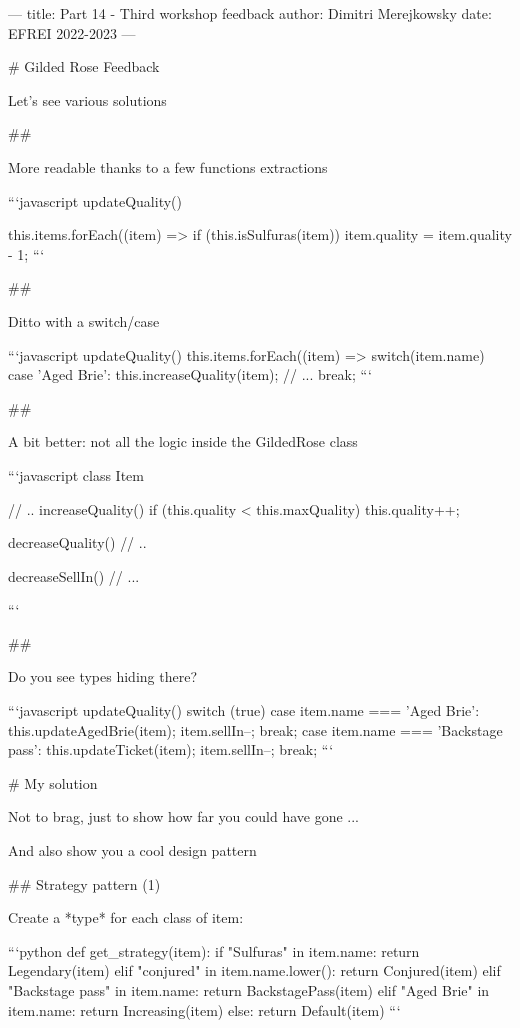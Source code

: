 ---
title: Part 14 - Third workshop feedback
author: Dimitri Merejkowsky
date: EFREI 2022-2023
---

# Gilded Rose Feedback

Let's see various solutions

##

More readable thanks to a few functions extractions

```javascript
updateQuality() {
  this.items.forEach((item) => {
    if (this.isSulfuras(item)) {
      item.quality = item.quality - 1;
    }
}
```

##

Ditto with a switch/case

```javascript
updateQuality() {
  this.items.forEach((item) => {
    switch(item.name) {
      case 'Aged Brie':
        this.increaseQuality(item);
        // ...
        break;
    }
  }
}
```

##

A bit better: not all the logic inside the GildedRose class

```javascript
class Item {
  // ..
  increaseQuality() {
    if (this.quality < this.maxQuality) this.quality++;
  }

  decreaseQuality() {
    // ..
  }

  decreaseSellIn() {
    // ...
  }
}
```

##

Do you see types hiding there?

```javascript
updateQuality() {
  switch (true) {
  case item.name === 'Aged Brie':
    this.updateAgedBrie(item);
    item.sellIn--;
    break;
  case item.name === 'Backstage pass':
    this.updateTicket(item);
    item.sellIn--;
    break;
  }
}
```

# My solution

Not to brag, just to show how far you could have gone ...

\vfill

And also show you a cool design pattern

## Strategy pattern (1)

Create a *type* for each class of item:

```python
def get_strategy(item):
    if "Sulfuras" in item.name:
        return Legendary(item)
    elif "conjured" in item.name.lower():
        return Conjured(item)
    elif "Backstage pass" in item.name:
        return BackstagePass(item)
    elif "Aged Brie" in item.name:
        return Increasing(item)
    else:
        return Default(item)
```


}
